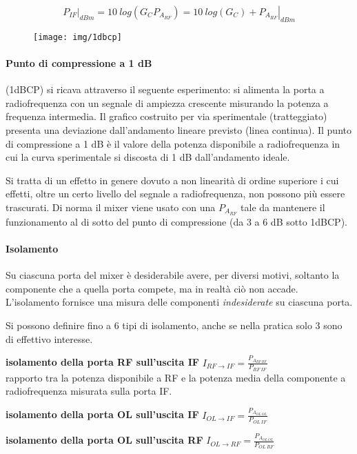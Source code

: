 $$\left. P_{IF}\right|_{dBm}  = 10~log(G_C {P_{A_{RF}}}) = 10~log(G_C) + \left.{P_{A_{RF}}}\right|_{dBm} $$

\begin{figure}[htb]
	\centering
	\texttt{[image: img/1dbcp]}
	\caption{}
	\label{fig:mixer-002}
\end{figure}

\paragraph{Punto di compressione a 1 dB} (1dBCP) si ricava attraverso
il seguente esperimento: si alimenta la porta a radiofrequenza con un segnale di ampiezza crescente misurando la potenza a frequenza intermedia.
Il grafico costruito per via sperimentale (tratteggiato) presenta una deviazione dall'andamento lineare previsto (linea continua). Il punto di compressione a 1 dB è il valore della potenza disponibile a radiofrequenza in cui la curva sperimentale si discosta di 1 dB dall'andamento ideale.

Si tratta di un	effetto in genere dovuto a non linearità di ordine superiore i cui effetti, oltre un certo livello del
segnale a radiofrequenza, non possono più essere trascurati.
Di norma il mixer viene usato con una ${P_{A_{RF}}}$ tale da mantenere il funzionamento al di sotto del punto
di compressione (da 3 a 6 dB sotto 1dBCP).

\paragraph{Isolamento}
Su ciascuna	porta del mixer è desiderabile avere, per diversi motivi, soltanto la componente che a quella porta compete, ma in realtà ciò non accade. L'isolamento fornisce una misura delle componenti \textit{indesiderate} su ciascuna porta.

Si possono definire fino a 6 tipi di isolamento, anche se nella pratica solo 3 sono di effettivo interesse.

\textbf{isolamento della porta RF sull'uscita IF} $I_{RF\rightarrow IF} = \frac{P_{A_{RF~RF}}}{P_{RF~IF}}$\\
rapporto tra la potenza disponibile a RF e la potenza media della componente a radiofrequenza misurata sulla porta IF.

\textbf{isolamento della porta OL sull'uscita IF} $I_{OL\rightarrow IF} = \frac{P_{A_{OL~OL}}}{P_{OL~IF}}$

\textbf{isolamento della porta OL sull'uscita RF} $I_{OL\rightarrow RF} = \frac{P_{A_{OL~OL}}}{P_{OL~RF}}$


